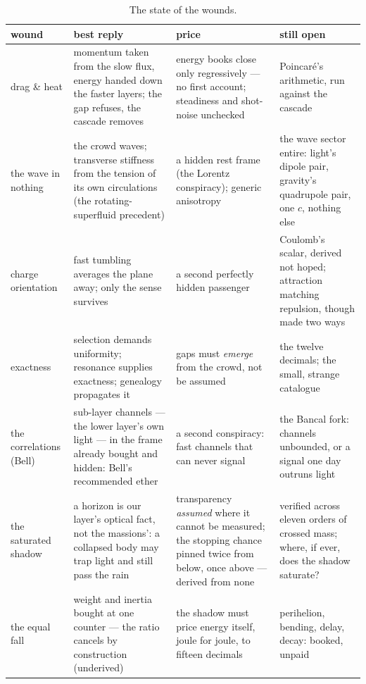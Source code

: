 \documentclass[fontsize=11pt,paper=a4,pagesize=auto,parskip=half-]{scrbook}
\begin{document}
\begin{table}[htbp]
\centering
\footnotesize
\captionsetup{font=footnotesize, skip=6pt}
\setlength{\tabcolsep}{3.5pt}
\begin{tabular}{P{1.85cm}P{3.05cm}P{2.9cm}P{2.6cm}}
\toprule
\textbf{wound} & \textbf{best reply} & \textbf{price} & \textbf{still open} \\
\midrule
drag \& heat & momentum taken from the slow flux, energy handed down the faster layers; the gap refuses, the cascade removes & energy books close only regressively --- no first account; steadiness and shot-noise unchecked & Poincar\'e's arithmetic, run against the cascade \\
\addlinespace[1pt]
the wave in nothing & the crowd waves; transverse stiffness from the tension of its own circulations (the rotating-superfluid precedent) & a hidden rest frame (the Lorentz conspiracy); generic anisotropy & the wave sector entire: light's dipole pair, gravity's quadrupole pair, one $c$, nothing else \\
\addlinespace[1pt]
charge orientation & fast tumbling averages the plane away; only the sense survives & a second perfectly hidden passenger & Coulomb's scalar, derived not hoped; attraction matching repulsion, though made two ways \\
\addlinespace[1pt]
exactness & selection demands uniformity; resonance supplies exactness; genealogy propagates it & gaps must \emph{emerge} from the crowd, not be assumed & the twelve decimals; the small, strange catalogue \\
\addlinespace[1pt]
the correlations (Bell) & sub-layer channels --- the lower layer's own light --- in the frame already bought and hidden: Bell's recommended ether & a second conspiracy: fast channels that can never signal & the Bancal fork: channels unbounded, or a signal one day outruns light \\
\addlinespace[1pt]
the saturated shadow & a horizon is our layer's optical fact, not the massions': a collapsed body may trap light and still pass the rain & transparency \emph{assumed} where it cannot be measured; the stopping chance pinned twice from below, once above --- derived from none & verified across eleven orders of crossed mass; where, if ever, does the shadow saturate? \\
\addlinespace[1pt]
the equal fall & weight and inertia bought at one counter --- the ratio cancels by construction (underived) & the shadow must price energy itself, joule for joule, to fifteen decimals & perihelion, bending, delay, decay: booked, unpaid \\
\bottomrule
\end{tabular}
\caption{The state of the wounds.}
\label{tab:wounds}
\end{table}
\end{document}
